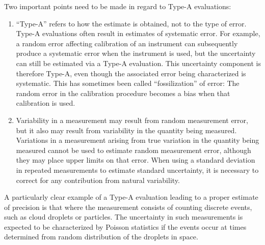 \documentclass[12pt,twoside,english]{article}\usepackage[]{graphicx}\usepackage[]{color}
\begin{document}
{{Two important points need to be made in regard to Type-A evaluations:  
\begin{enumerate}
\item ``Type-A'' refers to how the estimate is obtained, not to the type of error. Type-A evaluations often result in estimates of systematic error. For example, a random error affecting calibration of an instrument can subsequently produce a systematic error when the instrument is used, but the uncertainty can still be estimated via a Type-A evaluation. This uncertainty component is therefore Type-A, even though the associated error being characterized is systematic. This has sometimes been called ``fossilization'' of error: The random error in the calibration procedure becomes a bias when that calibration is used.  
\item Variability in a measurement may result from random measurement error, but it also may result from variability in the quantity being measured. Variations in a measurement arising from true variation in the quantity being measured cannot be used to estimate random measurement error, although they may place upper limits on that error. When using a standard deviation in repeated measurements to estimate standard uncertainty, it is necessary to correct for any contribution from natural variability.  
\end{enumerate}
A particularly clear example of a Type-A evaluation leading to a proper estimate of precision is that where the measurement consists of counting discrete events, such as cloud droplets or particles. The uncertainty in such measurements is expected to be characterized by Poisson statistics if the events occur at times determined from random distribution of the droplets in space. 

}}
\end{document}
